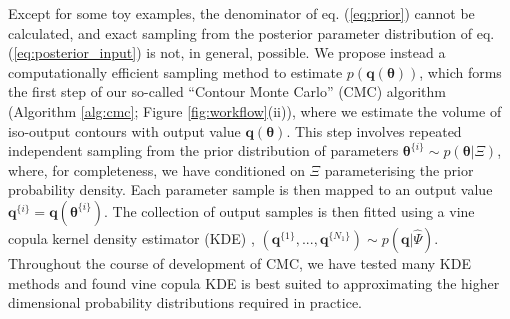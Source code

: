 Except for some toy examples, the denominator of eq. (\ref{eq:prior}) cannot be calculated, and exact sampling from the posterior parameter distribution of eq. (\ref{eq:posterior_input}) is not, in general, possible. We propose instead a computationally efficient sampling method to estimate $p(\boldsymbol{q}(\boldsymbol{\theta}))$, which forms the first step of our so-called ``Contour Monte Carlo'' (CMC) algorithm (Algorithm \ref{alg:cmc}; Figure \ref{fig:workflow}(ii)), where we estimate the volume of iso-output contours with output value $\boldsymbol{q}(\boldsymbol{\theta})$. This step involves repeated independent sampling from the prior distribution of parameters $\boldsymbol{\theta}^{\{i\}}\sim p(\boldsymbol{\theta}|\Xi)$, where, for completeness, we have conditioned on $\Xi$ parameterising the prior probability density. Each parameter sample is then mapped to an output value $\boldsymbol{q}^{\{i\}}=\boldsymbol{q}(\boldsymbol{\theta}^{\{i\}})$. The collection of output samples is then fitted using a vine copula kernel density estimator (KDE) \cite{nagler2016evading}, $(\boldsymbol{q}^{\{1\}},...,\boldsymbol{q}^{\{N_1\}})\sim p({\boldsymbol{q}}|\hat{\Psi})$. Throughout the course of development of CMC, we have tested many KDE methods and found vine copula KDE is best suited to approximating the higher dimensional probability distributions required in practice.


